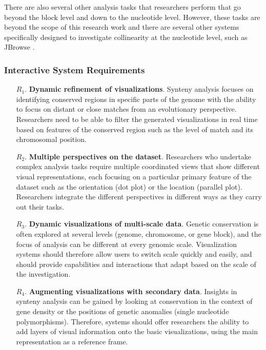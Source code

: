 There are also several other analysis tasks that researchers perform that go beyond the block level and down to the nucleotide level. However, these tasks are beyond the scope of this research work and there are several other systems specifically designed to investigate collinearity at the nucleotide level, such as JBrowse \cite{skinner2009jbrowse}.

\subsubsection{Interactive System Requirements}
 \begin{enumerate}
\item [$R_1$.] \textbf{Dynamic refinement of visualizations}. Synteny analysis focuses on identifying conserved regions in specific parts of the genome with the ability to focus on distant or close matches from an evolutionary perspective. Researchers need to be able to filter the generated visualizations in real time based on features of the conserved region such as the level of match and its chromosomal position. 

\item [$R_2$.] \textbf{Multiple perspectives on the dataset}. Researchers who undertake complex analysis tasks require multiple coordinated views that show different visual representations, each focusing on a particular primary feature of the dataset such as the orientation (dot plot) or the location (parallel plot). Researchers integrate the different perspectives in different ways as they carry out their tasks.

\item [$R_3$.] \textbf{Dynamic visualizations of multi-scale data}. Genetic conservation is often explored at several levels (genome, chromosome, or gene block), and the focus of analysis can be different at every genomic scale. Visualization systems should therefore allow users to switch scale quickly and easily, and should provide capabilities and interactions that adapt based on the scale of the investigation.

\item [$R_4$.] \textbf{Augmenting visualizations with secondary data}. Insights in synteny analysis can be gained by looking at conservation in the context of gene density or the positions of genetic anomalies (single nucleotide polymorphisms). Therefore, systems should offer researchers the ability to add layers of visual information onto the basic visualizations, using the main representation as a reference frame.


\end{enumerate}

